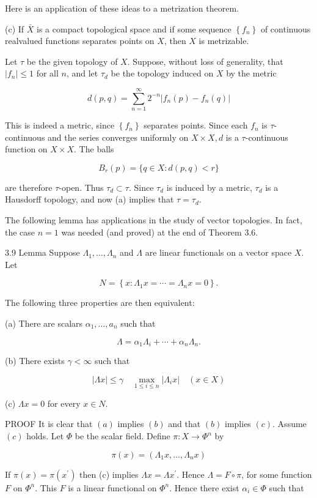 \documentclass[10pt]{article}
\begin{document}
Here is an application of these ideas to a metrization theorem.

(c) If $\bar{X}$ is a compact topological space and if some sequence $\left\{f_{n}\right\}$ of continuous realvalued functions separates points on $X$, then $X$ is metrizable.

Let $\tau$ be the given topology of $X$. Suppose, without loss of generality, that $\left|f_{n}\right| \leq 1$ for all $n$, and let $\tau_{d}$ be the topology induced on $X$ by the metric

$$
d(p, q)=\sum_{n=1}^{\infty} 2^{-n}\left|f_{n}(p)-f_{n}(q)\right|
$$

This is indeed a metric, since $\left\{f_{n}\right\}$ separates points. Since each $f_{n}$ is $\tau$-continuous and the series converges uniformly on $X \times X, d$ is a $\tau$-continuous function on $X \times X$. The balls

$$
B_{r}(p)=\{q \in X: d(p, q)<r\}
$$

are therefore $\tau$-open. Thus $\tau_{d} \subset \tau$. Since $\tau_{d}$ is induced by a metric, $\tau_{d}$ is a Hausdorff topology, and now (a) implies that $\tau=\tau_{d}$.

The following lemma has applications in the study of vector topologies. In fact, the case $n=1$ was needed (and proved) at the end of Theorem 3.6.

3.9 Lemma Suppose $\Lambda_{1}, \ldots, \Lambda_{n}$ and $\Lambda$ are linear functionals on a vector space $X$. Let

$$
N=\left\{x: \Lambda_{1} x=\cdots=\Lambda_{n} x=0\right\} .
$$

The following three properties are then equivalent:

(a) There are scalars $\alpha_{1}, \ldots, a_{n}$ such that

$$
\Lambda=\alpha_{1} \Lambda_{i}+\cdots+\alpha_{n} \Lambda_{n} .
$$

(b) There exists $\gamma<\infty$ such that

$$
|\Lambda x| \leq \gamma \quad \max _{1 \leq i \leq n}\left|\Lambda_{i} x\right| \quad(x \in X)
$$

(c) $\Lambda x=0$ for every $x \in N$.

PROOF It is clear that $(a)$ implies $(b)$ and that $(b)$ implies $(c)$. Assume $(c)$ holds. Let $\Phi$ be the scalar field. Define $\pi: X \rightarrow \Phi^{n}$ by

$$
\pi(x)=\left(\Lambda_{1} x, \ldots, \Lambda_{n} x\right)
$$

If $\pi(x)=\pi\left(x^{\prime}\right)$ then (c) implies $\Lambda x=\Lambda x^{\prime}$. Hence $\Lambda=F \circ \pi$, for some function $F$ on $\Phi^{n}$. This $F$ is a linear functional on $\Phi^{n}$. Hence there exist $\alpha_{i} \in \Phi$ such that
\end{document}
